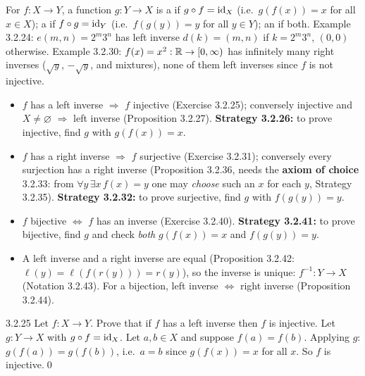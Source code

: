 \begin{key}
For $f:X\to Y$, a function $g:Y\to X$ is a  if $g\circ f=\mathrm{id}_X$ (i.e.\ $g(f(x))=x$ for all $x\in X$); a  if $f\circ g=\mathrm{id}_Y$ (i.e.\ $f(g(y))=y$ for all $y\in Y$); an  if both. Example 3.2.24: $e(m,n)=2^m3^n$ has left inverse $d(k)=(m,n)$ if $k=2^m3^n$, $(0,0)$ otherwise. Example 3.2.30: $f(x)=x^2:\mathbb{R}\to[0,\infty)$ has infinitely many right inverses ($\sqrt y$, $-\sqrt y$, and mixtures), none of them left inverses since $f$ is not injective.
\end{key}
\begin{result}
\begin{itemize}
\item $f$ has a left inverse $\Rightarrow$ $f$ injective (Exercise 3.2.25); conversely injective and $X\ne\varnothing$ $\Rightarrow$ left inverse (Proposition 3.2.27). \textbf{Strategy 3.2.26:} to prove injective, find $g$ with $g(f(x))=x$.
\item $f$ has a right inverse $\Rightarrow$ $f$ surjective (Exercise 3.2.31); conversely every surjection has a right inverse (Proposition 3.2.36, needs the \textbf{axiom of choice} 3.2.33: from $\forall y\,\exists x\,f(x)=y$ one may \emph{choose} such an $x$ for each $y$, Strategy 3.2.35). \textbf{Strategy 3.2.32:} to prove surjective, find $g$ with $f(g(y))=y$.
\item $f$ bijective $\Leftrightarrow$ $f$ has an inverse (Exercise 3.2.40). \textbf{Strategy 3.2.41:} to prove bijective, find $g$ and check \emph{both} $g(f(x))=x$ and $f(g(y))=y$.
\item A left inverse and a right inverse are equal (Proposition 3.2.42: $\ell(y)=\ell(f(r(y)))=r(y)$), so the inverse is unique: $f^{-1}:Y\to X$ (Notation 3.2.43). For a bijection, left inverse $\Leftrightarrow$ right inverse (Proposition 3.2.44).
\end{itemize}
\end{result}

\begin{bookex}[recommended]{3.2.25}
Let $f:X\to Y$. Prove that if $f$ has a left inverse then $f$ is injective.
\solution
Let $g:Y\to X$ with $g\circ f=\mathrm{id}_X$. Let $a,b\in X$ and suppose $f(a)=f(b)$. Applying $g$: $g(f(a))=g(f(b))$, i.e.\ $a=b$ since $g(f(x))=x$ for all $x$. So $f$ is injective.\qed
\end{bookex}

